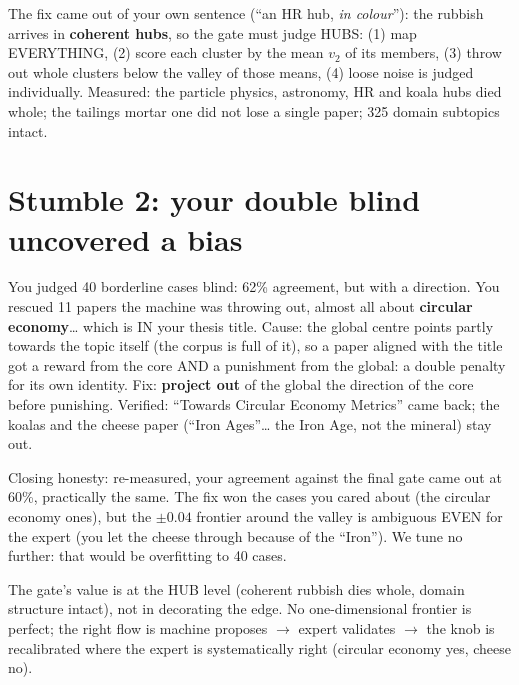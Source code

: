 \documentclass[11pt,a4paper]{article}
\begin{document}
The fix came out of your own sentence (``an HR hub, \emph{in colour}''): the rubbish arrives in
\textbf{coherent hubs}, so the gate must judge HUBS: (1) map EVERYTHING, (2) score each cluster
by the mean $v_2$ of its members, (3) throw out whole clusters below the valley of those means,
(4) loose noise is judged individually. Measured: the particle physics, astronomy, HR and koala
hubs died whole; the tailings mortar one did not lose a single paper; 325 domain subtopics
intact.

\section{Stumble 2: your double blind uncovered a bias}

You judged 40 borderline cases blind: 62\% agreement, but with a direction. You rescued 11
papers the machine was throwing out, almost all about \textbf{circular economy}\ldots{} which is
IN your thesis title. Cause: the global centre points partly towards the topic itself (the
corpus is full of it), so a paper aligned with the title got a reward from the core AND a
punishment from the global: a double penalty for its own identity. Fix: \textbf{project out} of
the global the direction of the core before punishing. Verified: ``Towards Circular Economy
Metrics'' came back; the koalas and the cheese paper (``Iron Ages''\ldots{} the Iron Age, not the
mineral) stay out.

Closing honesty: re-measured, your agreement against the final gate came out at 60\%,
practically the same. The fix won the cases you cared about (the circular economy ones), but the
$\pm0.04$ frontier around the valley is ambiguous EVEN for the expert (you let the cheese
through because of the ``Iron''). We tune no further: that would be overfitting to 40 cases.

\begin{ojo}
The gate's value is at the HUB level (coherent rubbish dies whole, domain structure intact), not
in decorating the edge. No one-dimensional frontier is perfect; the right flow is machine
proposes $\to$ expert validates $\to$ the knob is recalibrated where the expert is
systematically right (circular economy yes, cheese no).
\end{ojo}
\end{document}
